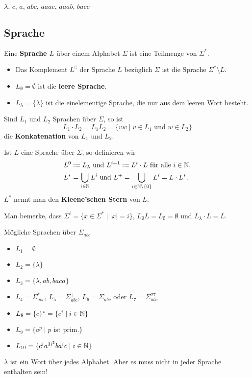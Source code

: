	$\lambda$, $c$, $a$, $abc$, $aaac$, $aaab$, $bacc$



\subsection{Sprache}


	
	\begin{mainbox}{}
	 Eine \textbf{Sprache $L$} über einem Alphabet $\Sigma$ ist eine Teilmenge von $\Sigma^*$. 
	\end{mainbox}
	\begin{itemize}[label=-]
		\item Das Komplement \textbf{$L^\complement$} der Sprache $L$ bezüglich $\Sigma$ ist die Sprache $\Sigma^* \setminus L$.
		\item $L_\emptyset = \emptyset$ ist die \textbf{leere Sprache}.
		\item $L_\lambda = \{\lambda\}$ ist die einelementige Sprache, die nur aus dem leeren Wort besteht.
	\end{itemize}
	
	\begin{mainbox}{}
		Sind $L_1$ und $L_2$ Sprachen über $\Sigma$, so ist 
		$$L_1 \cdot L_2 = L_1L_2 = \{vw \mid v \in L_1 \text{ und } w \in L_2\}$$
		die \textbf{Konkatenation} von $L_1$ und $L_2$. 
	\end{mainbox}



	\begin{mainbox}{}
		Ist $L$ eine Sprache über $\Sigma$, so definieren wir
		\begin{align*}
			&L^0 := L_{\lambda} \text{ und } L^{i+1} := L^{i}\cdot L \text{ für alle } i \in \mathbb{N},\\
			&L^* = \bigcup_{i \in \mathbb{N}}L^i \text{ und } L^+ = \bigcup_{i \in \mathbb{N} \setminus \{0\}} L^i = L \cdot L^*.
		\end{align*}
		$L^*$ nennt man den \textbf{Kleene'schen Stern} von $L$.
	\end{mainbox}
	Man bemerke, dass $\Sigma^i = \{x \in \Sigma^* \mid |x| = i\}$, $L_\emptyset L = L_\emptyset = \emptyset$ und $L_\lambda \cdot L = L$.
	



	Mögliche Sprachen über $\Sigma_{abc}$
	\begin{itemize}[label=-]
		\item $L_1 = \emptyset$
		\item $L_2 = \{\lambda\}$
		\item $L_3 = \{\lambda, ab, baca\}$
		\item $L_4 = \Sigma_{abc}^*$, $L_5 = \Sigma_{abc}^+$, $L_6 = \Sigma_{abc}$ oder $L_7 = \Sigma_{abc}^{27}$
		\item $L_8 = \{c\}^* = \{c^i \mid i \in \mathbb{N}\}$
		\item $L_9 = \{a^p \mid p \text{ ist prim.}\}$
		\item $L_{10} = \{c^{i}a^{3i^2}ba^ic \mid i \in \mathbb{N}\}$
	\end{itemize}
	$\lambda$ ist ein Wort über jedes Alphabet. Aber es muss nicht in jeder Sprache enthalten sein!


